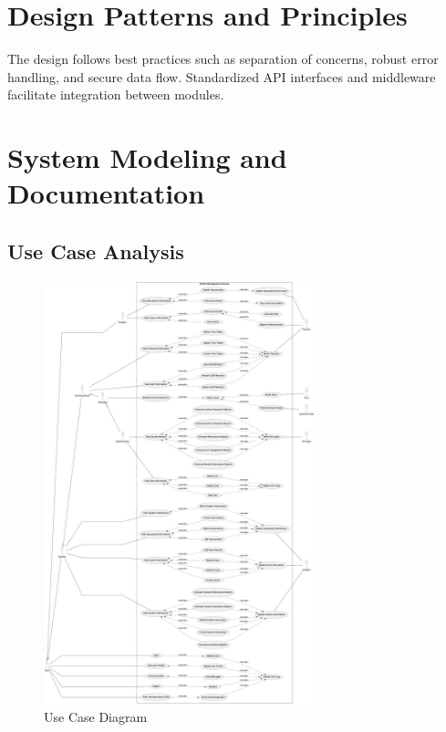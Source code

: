 \documentclass[12pt,a4paper]{report}
\begin{document}
\section{Design Patterns and Principles}
The design follows best practices such as separation of concerns, robust error handling, and secure data flow. Standardized API interfaces and middleware facilitate integration between modules.

\section{System Modeling and Documentation}
\subsection{Use Case Analysis}
\begin{figure}[htbp]
    \centering
    \includegraphics[width=0.7\textwidth]{use-case-diagram.png}
    \caption{Use Case Diagram}
    \label{fig:use-case-diagram}
\end{figure}
\end{document}
